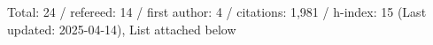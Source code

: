 Total: 24 / refereed: 14 / first author: 4 / citations: 1,981 / h-index: 15 (Last updated: 2025-04-14), List attached below